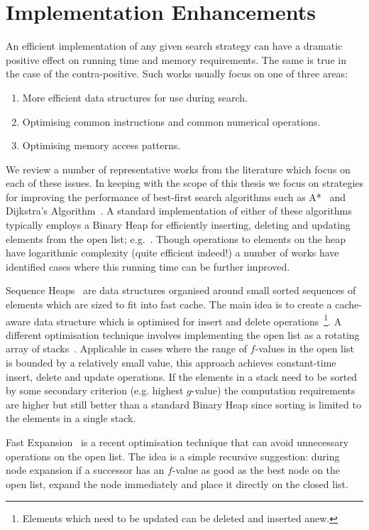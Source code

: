 \section{Implementation Enhancements}
\label{cha::lit::impl}
An efficient implementation of any given search strategy can have a dramatic
positive effect on running time and memory requirements. The same is true in
the case of the contra-positive.  Such works usually focus on one of three
areas:
\begin{enumerate}
\item More efficient data structures for use during search.
\item Optimising common instructions and common numerical operations.
\item Optimising memory access patterns.
\end{enumerate}
We review a number of representative works from the literature which focus on
each of these issues. In keeping with the scope of this thesis we focus on
strategies for improving the performance of best-first search algorithms such
as A*~\citep{hart68} and Dijkstra's Algorithm~\citep{dijkstra59}. A standard
implementation of either of these algorithms typically employs a Binary Heap
for efficiently inserting, deleting and updating elements from the open list;
e.g.~\citep{stout96,botea04}.  Though operations to elements on the heap have
logarithmic complexity (quite efficient indeed!) a number of works have
identified cases where this running time can be further improved.

Sequence Heaps~\citep{sanders99} are data structures organised around small
sorted sequences of elements which are sized to fit into fast cache. The main
idea is to create a cache-aware data structure which is optimised for insert
and delete operations~\footnote{Elements which need to be updated can be
deleted and inserted anew.}. A different optimisation technique involves
implementing the open list as a rotating array of stacks~\citep{Cazenave:06}.
Applicable in cases where the range of $f$-values in the open list is bounded
by a relatively small value, this approach achieves constant-time insert,
delete and update operations. If the elements in a stack need to be sorted by
some secondary criterion (e.g. highest $g$-value) the computation requirements
are higher but still better than a standard Binary Heap since sorting is
limited to the elements in a single stack.

Fast Expansion~\citep{sun09} is a recent optimisation technique that can avoid
unnecessary operations on the open list. The idea is a simple recursive
suggestion: during node expansion if a successor has an $f$-value as good as
the best node on the open list, expand the node immediately and place it
directly on the closed list.

